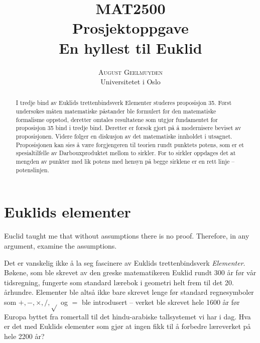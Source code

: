 \documentclass[norsk,twoside,utf8]{article}
\title{\vspace{-15mm}\fontsize{24pt}{10pt}\selectfont\textbf{MAT2500 \\ Prosjektoppgave \\ En hyllest til Euklid}} %
\author{
\large
\textsc{
August Geelmuyden
} \\
\normalsize Universitetet i Oslo \\ %
\vspace{-5mm}
}
\date{}
\begin{document}
\maketitle %


\begin{abstract}

\noindent
I tredje bind av Euklids trettenbindsverk Elementer studeres proposisjon 35. Først undersøkes måten matematiske påstander ble formulert før den matematiske formalisme oppstod, deretter omtales resultatene som utgjør fundamentet for proposisjon 35 bind i tredje bind. Deretter er forsøk gjort på å modernisere beviset av proposisjonen. Videre følger en diskusjon av det matematiske innholdet i utsagnet. Proposisjonen kan sies å være forgjengeren til teorien rundt punktets potens, som er et spesialtilfelle av Darbouxproduktet mellom to sirkler. For to sirkler oppdages det at mengden av punkter med lik potens med hensyn på begge sirklene er en rett linje -- potenslinjen. 

\end{abstract}



\section{Euklids elementer}
 \begin{fquote}[E. T. Bell]
  Euclid taught me that without assumptions there is no proof. Therefore, in any argument, examine the assumptions.
 \end{fquote}

\noindent
Det er vanskelig ikke å la seg fascinere av Euklids trettenbindsverk \textit{Elementer}. Bøkene, som ble skrevet av den greske matematikeren Euklid rundt 300 år før vår tidsregning, fungerte som standard lærebok i geometri helt frem til det 20. århundre. Elementer ble altså ikke bare skrevet lenge før standard regnesymboler som $+,-,\times,/,\sqrt{}$ og $=$ ble introdusert -- verket ble skrevet hele 1600 år før Europa byttet fra romertall til det hindu-arabiske tallsystemet vi har i dag. Hva er det med Euklids elementer som gjør at ingen fikk til å forbedre læreverket på hele 2200 år? 
\end{document}
